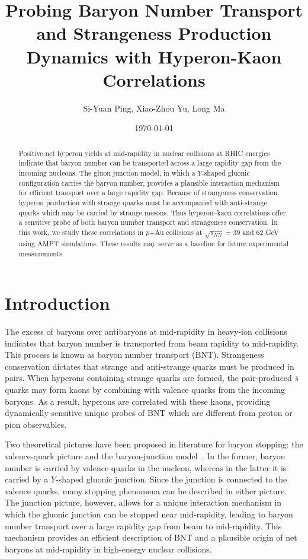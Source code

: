 \documentclass[a4paper,12pt]{article}
\begin{document}
\title{\normalsize Probing Baryon Number Transport and Strangeness Production Dynamics with Hyperon-Kaon Correlations}

\author{Si-Yuan Ping, Xiao-Zhou Yu, Long Ma}

\date{\today}
\maketitle

\begin{abstract}
Positive net hyperon yields at mid-rapidity in nuclear collisions at RHIC energies indicate that baryon number can be transported across a large rapidity gap from the incoming nucleons. The gluon junction model, in which a $Y$-shaped gluonic configuration carries the baryon number, provides a plausible interaction mechanism for efficient transport over a large rapidity gap. Because of strangeness conservation, hyperon production with strange quarks must be accompanied with anti-strange quarks which may be carried by strange mesons. Thus hyperon–kaon correlations offer a sensitive probe of both baryon number transport and strangeness conservation. In this work, we study these correlations in $p$+Au collisions at $\sqrt{s_{NN}}=39$ and $62$ GeV using AMPT simulations. These results may serve as a baseline for future experimental measurements.
\end{abstract}

\section{Introduction}

The excess of baryons over antibaryons at mid-rapidity in heavy-ion collisions~\cite{NSIACA} indicates that baryon number is transported from beam rapidity to mid-rapidity. This process is known as baryon number transport (BNT). Strangeness conservation dictates that strange and anti-strange quarks must be produced in pairs. When hyperons containing strange quarks are formed, the pair-produced $\overline{s}$ quarks may form kaons by combining with valence quarks from the incoming baryons.
As a result, hyperons are correlated with these kaons, providing dynamically sensitive unique probes of BNT which are different from proton or pion observables.

Two theoretical pictures have been proposed in literature for baryon stopping: the valence-quark picture and the baryon-junction model~\cite{KharzeevCGTBN}.
In the former, baryon number is carried by valence quarks in the nucleon, whereas in the latter it is carried by a $Y$-shaped gluonic junction.
Since the junction is connected to the valence quarks, many stopping phenomena can be described in either picture.
The junction picture, however, allows for a unique interaction mechanism in which the gluonic junction can be stopped near mid-rapidity, leading to baryon number transport over a large rapidity gap from beam to mid-rapidity.
This mechanism provides an efficient description of BNT and a plausible origin of net baryons at mid-rapidity in high-energy nuclear collisions.
\end{document}
